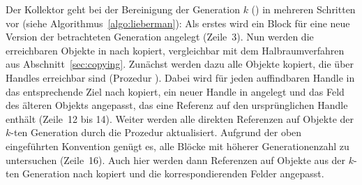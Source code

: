 Der Kollektor geht bei der Bereinigung der Generation $k$  () in mehreren Schritten vor (siehe Algorithmus~\ref{algo:lieberman}):
Als erstes wird ein Block für eine neue Version  der betrachteten Generation angelegt (Zeile~3).
Nun werden die erreichbaren Objekte in  nach  kopiert, vergleichbar mit dem Halbraumverfahren aus Abschnitt~\ref{sec:copying}.
Zunächst werden dazu alle Objekte kopiert, die über Handles erreichbar sind (Prozedur ).
Dabei wird für jeden auffindbaren Handle in  das entsprechende Ziel nach  kopiert, ein neuer Handle in  angelegt und das Feld des älteren Objekts angepasst, das eine Referenz auf den ursprünglichen Handle enthält (Zeile~12 bis 14).
Weiter werden alle direkten Referenzen auf Objekte der $k$-ten Generation durch die Prozedur  aktualisiert.
Aufgrund der oben eingeführten Konvention genügt es, alle Blöcke mit höherer Generationenzahl zu untersuchen (Zeile~16).
Auch hier werden dann Referenzen auf Objekte aus der $k$-ten Generation nach  kopiert und die korrespondierenden Felder angepasst.

